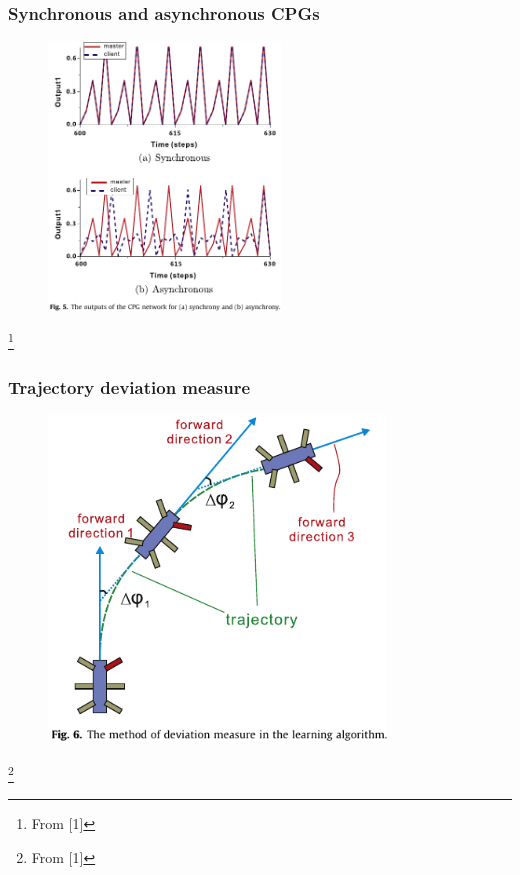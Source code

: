 \documentclass{beamer}
\begin{document}
\begin{frame}
\frametitle{Synchronous and asynchronous CPGs}
    \vspace*{-0.4cm}
\begin{figure}
\center
\includegraphics[width=0.55\textwidth]{figs/synchrony-asynchrony.pdf}
\end{figure}
\footnote{From [1]}
\end{frame}

\begin{frame}
\frametitle{Trajectory deviation measure}
\begin{figure}
\center
\includegraphics[width=0.8\textwidth]{figs/deviation-measure.pdf}
\end{figure}
\footnote{From [1]}
\end{frame}
\end{document}
